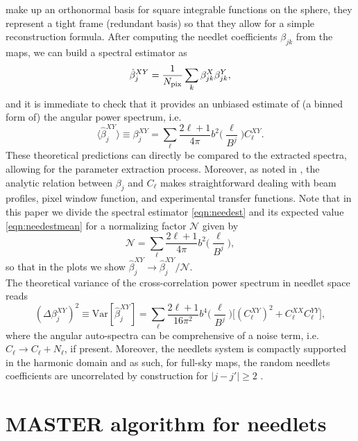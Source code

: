 \documentclass[a4paper,11pt]{article}
\begin{document}
make up an orthonormal basis for square integrable functions on the sphere, they represent a tight frame (redundant basis) so that they allow for a
simple reconstruction formula. After computing the needlet coefficients $\beta_{jk}$ from the maps, we can build a spectral estimator as
%
\begin{equation}
\label{eqn:needest}
\hat{\beta}^{XY}_{j} = \frac{1}{N_{\rm pix}} \sum_k \beta^X_{jk}\beta^Y_{jk},
\end{equation}
%
and it is immediate to check that it provides an unbiased estimate of (a binned form of) the angular power spectrum, i.e.
%
\begin{equation}
\label{eqn:needestmean}
\langle \hat{\beta}^{XY}_{j} \rangle \equiv \beta^{XY}_{j} = \sum_{\ell} \frac{2\ell+1}{4\pi}  b^2 \biggl( \frac{\ell}{B^j} \biggr) C^{XY}_{\ell}.
\end{equation}
%
These theoretical predictions can directly be compared to the extracted spectra, allowing for the parameter extraction process.
Moreover, as noted in \cite{Pietrobon2006}, the analytic relation between $\beta_j$ and $C_{\ell}$ makes straightforward dealing 
with beam profiles, pixel window function, and experimental transfer functions. 
Note that in this paper we divide the spectral estimator \ref{eqn:needest} and its expected value \ref{eqn:needestmean} for a normalizing
factor $\mathcal{N}$ given by 
%
\begin{equation}
\label{eqn:norm}
\mathcal{N} = \sum_{\ell} \frac{2\ell+1}{4\pi}  b^2\biggl( \frac{\ell}{B^j} \biggr),
\end{equation}
%
so that in the plots we show $\hat{\beta}^{XY}_{j} \to \hat{\beta}^{XY}_{j}/\mathcal{N}$.\\
The theoretical variance of the cross-correlation power spectrum in needlet space reads
%
\begin{equation}
\label{eqn:needestvar}
(\Delta\beta^{XY}_j)^2 \equiv \text{Var}[\hat{\beta}^{XY}_j]= \sum_{\ell} \frac{2\ell+1}{16\pi^2}  b^4 \biggl( \frac{\ell}{B^j} \biggr)
 \bigl[ (C_{\ell}^{XY})^2 + C_{\ell}^{XX}C_{\ell}^{YY} \bigr],
\end{equation}
%
where the angular auto-spectra can be comprehensive of a noise term, i.e. 
$C_{\ell} \to C_{\ell} + N_{\ell}$, if present. Moreover, the needlets system 
is compactly supported in the harmonic domain and as such, for full-sky maps, the random needlets coefficients are uncorrelated by 
construction for $|j-j'| \ge 2$ \citep{Baldi2009a}.


\section{MASTER algorithm for needlets}
\label{sec:master}
\end{document}
